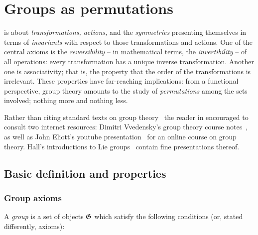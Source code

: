 \chapter{Groups as permutations}
\label{2012-m-ch-gt}

 is about {\em transformations, actions,} and the {\em symmetries} presenting themselves in terms of {\em invariants} with respect to those transformations and actions.
One of the central axioms is the {\em reversibility} -- in mathematical terms, the {\em invertibility} -- of all operations: every transformation has a unique inverse transformation.
Another one is associativity; that is, the property that the order of the transformations is irrelevant.
These properties have far-reaching implications: from a functional perspective, group theory amounts to the study of {\em permutations} among the sets involved; nothing more and nothing less.

Rather than citing standard texts on group theory~\cite{rotman} the reader in encouraged to consult
two internet resources: Dimitri Vvedensky's group theory course notes~\cite{vvedensky-grouptheory},
as well as
John Eliott's youtube presentation~\cite{eliott-gt-yt} for an online course on group theory.
Hall's introductions to Lie groups~\cite{hall-2000,hall-2015} contain fine presentations thereof.


\section{Basic definition and properties}

\subsection{Group axioms}

A {\em group} is a set of objects ${\frak G}$ which satisfy the following conditions (or, stated differently, axioms):


